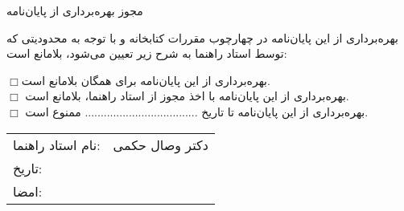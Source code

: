 \newpage
\thispagestyle{empty}
\begin{center}
{\Large
    مجوز بهره‌برداری از پایان‌نامه \\
}
    \vspace{.5cm}
\end{center}

بهره‌برداری از این پایان‌نامه در چهارچوب مقررات كتابخانه و با توجه به محدودیتی كه توسط استاد راهنما به شرح زیر تعیین می‌شود، بلامانع است:

\vspace{1cm}
\noindent$\Box$بهره‌برداری از این پایان‌نامه برای همگان بلامانع است.\\
$\Box$ بهره‌برداری از این پایان‌نامه با اخذ مجوز از استاد راهنما، بلامانع است.\\
$\Box$ بهره‌برداری از این پایان‌نامه تا تاریخ .................................... ممنوع است.\\

\vspace{1cm}
\begin{flushleft}
    \begin{tabular}{l p{}}
        نام استاد راهنما: & دکتر وصال حکمی \\
        تاریخ: & \\
        امضا: & \\

    \end{tabular}
\end{flushleft}
\cleardoublepage